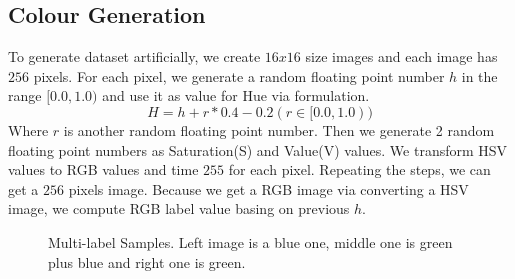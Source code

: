 \subsection{Colour Generation}

To generate dataset artificially, we create $16x16$ size images and each image has $256$ pixels. For each pixel, we generate a random floating point number $h$ in the range $[0.0, 1.0)$ and use it as value for Hue via formulation.
\begin{equation}\label{eq:FormulationHue}
H = h + r * 0.4 - 0.2 (r \in [0.0,1.0))
\end{equation}
Where $r$ is another random floating point number. Then we generate 2 random floating point numbers as Saturation(S) and Value(V) values. We transform HSV values to RGB values and time $255$ for each pixel. Repeating the steps, we can get a $256$ pixels image. Because we get a RGB image via converting a HSV image, we compute RGB label value basing on previous $h$.

\graphicspath{ {./Figures/} }
\begin{figure}[!htb]
\centering     %
{}
\caption{Multi-label Samples. Left image is a blue one, middle one is green plus blue and right one is green.}
\end{figure}

